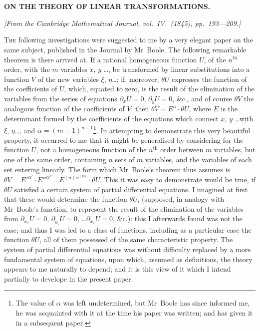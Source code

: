 \documentclass[11pt,a4paper]{article}
\theoremstyle{plain}
\theoremstyle{definition}
\theoremstyle{remark}
\begin{document}
\section{}
\begin{center}
\textbf{ON THE THEORY OF LINEAR TRANSFORMATIONS.}
\end{center}
\textit{[From the Cambridge Mathematical Journal, vol.\ IV.\ (1845), pp.\ 193---209.]}

\vspace{6pt}

\textsc{The} following investigations were suggested to me by a very elegant paper on
the same subject, published in the Journal by Mr~Boole. The following remarkable
theorem is there arrived at. If a rational homogeneous function $U$, of the $n^{\text{th}}$ order,
with the $m$ variables $x$, $y$ \ldots, be transformed by linear substitutions into a function
$V$ of the new variables $\xi$, $\eta$\ldots; if, moreover, $\theta U$ expresses the function of the
coefficients of $U$, which, equated to zero, is the result of the elimination of the
variables from the series of equations $\partial_x U=0$, $\partial_y U=0$, \&c., and of course $\theta V$ the
analogous function of the coefficients of $V$: then $\theta V = E^{\alpha}\cdot\theta U$, where $E$ is the
determinant formed by the coefficients of the equations which connect $x$, $y$ \ldots with
$\xi$, $\eta$\ldots, and $\alpha=(m-1)^{n-1}$\footnote{The value of $\alpha$ was left undetermined, but Mr~Boole has since informed me, he was acquainted with
it at the time his paper was written; and has given it in a subsequent paper.}.
In attempting to demonstrate this very beautiful property,
it occurred to me that it might be generalised by considering for the function $U$, not
a homogeneous function of the $n^{\text{th}}$ order between $m$ variables, but one of the same
order, containing $n$ sets of $m$ variables, and the variables of each set entering
linearly. The form which Mr~Boole's theorem thus assumes is $\theta V = E'^{\alpha'}\cdot E''^{\alpha''}\,\ldots E^{(n)\alpha^{(n)}}\cdot\theta U$.
This it was easy to demonstrate would be true, if $\theta U$ satisfied a certain system of
partial differential equations. I imagined at first that these would determine the
function $\theta U$, (supposed, in analogy with Mr~Boole's function, to represent the result of
the elimination of the variables from $\partial_{x_1}U=0$, $\partial_{y_1}U=0$, \ldots $\partial_{x_2}U=0$, \&c.): this I afterwards
found was not the case; and thus I was led to a class of functions, including as
a particular case the function $\theta U$, all of them possessed of the same characteristic
property. The system of partial differential equations was without difficulty replaced
by a more fundamental system of equations, upon which, assumed as definitions, the
theory appears to me naturally to depend; and it is this view of it which I intend
partially to develope in the present paper.
\end{document}
